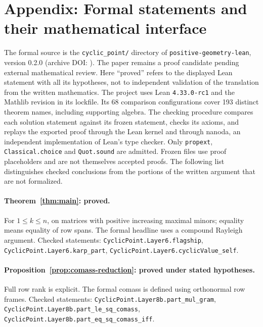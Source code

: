 \documentclass[11pt]{article}
\begin{document}
\section*{Appendix: Formal statements and their mathematical interface}
The formal source is the \texttt{cyclic\_point/} directory of
\texttt{positive-geometry-lean}, version 0.2.0 (archive DOI: \texttt{\CyclicArchiveDOI}).
The paper remains a proof candidate pending external mathematical review.
Here ``proved'' refers to the displayed Lean statement with all its hypotheses,
not to independent validation of the translation from the written mathematics.
The project uses Lean \texttt{4.33.0-rc1} and the Mathlib revision in its lockfile.
Its 68 comparison configurations cover 193 distinct theorem names, including supporting algebra.
The checking procedure compares each solution statement against its frozen statement,
checks its axioms, and replays the exported proof through the Lean kernel and through nanoda, an independent implementation of Lean's type checker.
Only \texttt{propext}, \texttt{Classical.choice} and \texttt{Quot.sound} are admitted.
Frozen files use proof placeholders and are not themselves accepted proofs.
The following list distinguishes checked conclusions from the portions of the written argument that are not formalized.

\paragraph{Theorem~\ref{thm:main}: proved.}
For $1\le k\le n$, on matrices with positive increasing maximal minors; equality means equality of row spans. The formal headline uses a compound Rayleigh argument.
Checked statements: \texttt{CyclicPoint.\allowbreak Layer6.\allowbreak flagship}, \texttt{CyclicPoint.\allowbreak Layer6.\allowbreak karp\_\allowbreak part}, \texttt{CyclicPoint.\allowbreak Layer6.\allowbreak cyclicValue\_\allowbreak self}.

\paragraph{Proposition~\ref{prop:comass-reduction}: proved under stated hypotheses.}
Full row rank is explicit. The formal comass is defined using orthonormal row frames.
Checked statements: \texttt{CyclicPoint.\allowbreak Layer8b.\allowbreak part\_\allowbreak mul\_\allowbreak gram}, \texttt{CyclicPoint.\allowbreak Layer8b.\allowbreak part\_\allowbreak le\_\allowbreak sq\_\allowbreak comass}, \texttt{CyclicPoint.\allowbreak Layer8b.\allowbreak part\_\allowbreak eq\_\allowbreak sq\_\allowbreak comass\_\allowbreak iff}.
\end{document}

